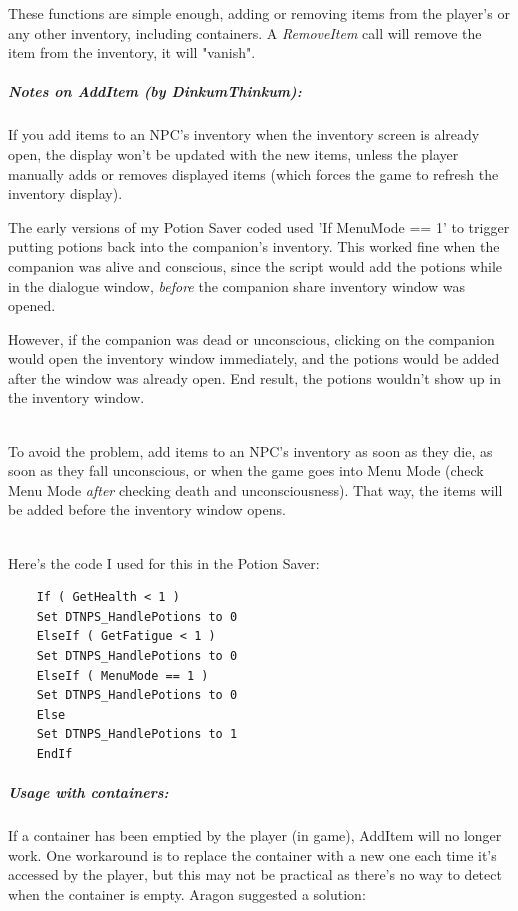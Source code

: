 These functions are simple enough, adding or removing items from the
player's or any other inventory, including containers. A
\emph{RemoveItem} call will remove the item from the inventory, it will
"vanish".

\hypertarget{notes-on-additem-by-dinkumthinkum}{%
\subparagraph{Notes on AddItem (by
DinkumThinkum):}\label{notes-on-additem-by-dinkumthinkum}}

If you add items to an NPC's inventory when the inventory screen is
already open, the display won't be updated with the new items, unless
the player manually adds or removes displayed items (which forces the
game to refresh the inventory display).

The early versions of my Potion Saver coded used 'If MenuMode == 1' to
trigger putting potions back into the companion's inventory. This worked
fine when the companion was alive and conscious, since the script would
add the potions while in the dialogue window, \emph{before} the
companion share inventory window was opened.

However, if the companion was dead or unconscious, clicking on the
companion would open the inventory window immediately, and the potions
would be added after the window was already open. End result, the
potions wouldn't show up in the inventory window.\\
\strut \\
To avoid the problem, add items to an NPC's inventory as soon as they
die, as soon as they fall unconscious, or when the game goes into Menu
Mode (check Menu Mode \emph{after} checking death and unconsciousness).
That way, the items will be added before the inventory window opens.\\
\strut \\
Here's the code I used for this in the Potion Saver:

\begin{lstlisting}
	If ( GetHealth < 1 )
	Set DTNPS_HandlePotions to 0
	ElseIf ( GetFatigue < 1 )
	Set DTNPS_HandlePotions to 0
	ElseIf ( MenuMode == 1 )
	Set DTNPS_HandlePotions to 0
	Else
	Set DTNPS_HandlePotions to 1
	EndIf
\end{lstlisting}

\hypertarget{usage-with-containers}{%
\subparagraph{Usage with containers:}\label{usage-with-containers}}

If a container has been emptied by the player (in game), AddItem will no
longer work. One workaround is to replace the container with a new one
each time it's accessed by the player, but this may not be practical as
there's no way to detect when the container is empty. Aragon suggested a
solution:

